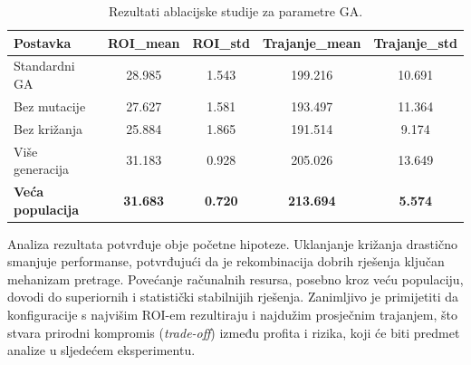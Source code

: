 \begin{table}[H]
    \centering
    \caption{Rezultati ablacijske studije za parametre GA.}
    \label{tab:ga_ablation}
    \begin{tabular}{|l|c|c|c|c|}
        \hline
        \textbf{Postavka} & \textbf{ROI\_mean} & \textbf{ROI\_std} & \textbf{Trajanje\_mean} & \textbf{Trajanje\_std} \\
        \hline
        Standardni GA & 28.985 & 1.543 & 199.216 & 10.691 \\
        Bez mutacije & 27.627 & 1.581 & 193.497 & 11.364 \\
        Bez križanja & 25.884 & 1.865 & 191.514 & 9.174 \\
        Više generacija & 31.183 & 0.928 & 205.026 & 13.649 \\
        \textbf{Veća populacija} & \textbf{31.683} & \textbf{0.720} & \textbf{213.694} & \textbf{5.574} \\
        \hline
    \end{tabular}
\end{table}

Analiza rezultata potvrđuje obje početne hipoteze. Uklanjanje križanja drastično smanjuje performanse, potvrđujući da je rekombinacija dobrih rješenja ključan mehanizam pretrage. Povećanje računalnih resursa, posebno kroz veću populaciju, dovodi do superiornih i statistički stabilnijih rješenja. Zanimljivo je primijetiti da konfiguracije s najvišim ROI-em rezultiraju i najdužim prosječnim trajanjem, što stvara prirodni kompromis (\emph{trade-off}) između profita i rizika, koji će biti predmet analize u sljedećem eksperimentu.

